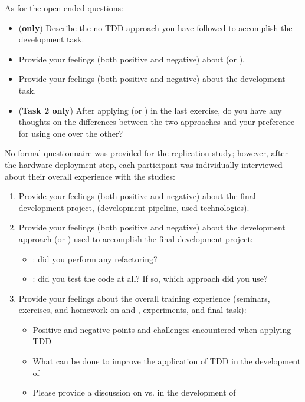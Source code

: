 \noindent As for the open-ended questions:
\begin{itemize}
    \item (\textbf{\notdd only}) Describe the no-TDD approach you have followed to accomplish the development task.
    \item Provide your feelings (both positive and negative) about (\ie \tdd or \notdd).
    \item Provide your feelings (both positive and negative) about the development task.
    \item (\textbf{Task 2 only}) After applying (\ie \tdd or \notdd) in the last exercise, do you have any thoughts on the differences between the two approaches and your preference for using one over the other?
\end{itemize}

\noindent No formal questionnaire was provided for the replication study; however, after the hardware deployment step, each participant was individually interviewed about their overall experience with the studies:
\begin{enumerate}
    \item Provide your feelings (both positive and negative) about the final development project, (\eg development pipeline, used technologies).
    \item Provide your feelings (both positive and negative) about the development approach (\ie \tdd or \notdd) used to accomplish the final development project:
        \begin{itemize}
            \item \tdd: did you perform any refactoring? 
            \item \notdd: did you test the code at all? If so, which approach did you use?
        \end{itemize}
    \item Provide your feelings about the overall training experience (seminars, exercises, and homework on \tdd and \notdd, experiments, and final task):
        \begin{itemize}
            \item Positive and negative points and challenges encountered when applying TDD
            \item What can be done to improve the application of TDD in the development of \ess
            \item Please provide a discussion on \tdd vs. \notdd in the development of \ess
        \end{itemize}
\end{enumerate}
 




